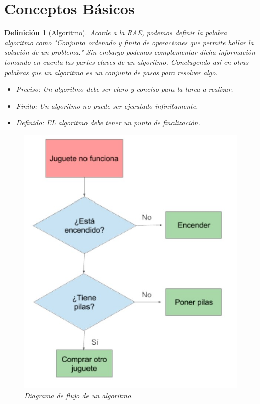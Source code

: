 \documentclass[12pt,twoside]{article}
\newtheorem{defi}{Definición}
\begin{document}
\section{Conceptos B\'asicos}
\begin{defi}[Algoritmo]
Acorde a la RAE, podemos definir la palabra algoritmo como "Conjunto ordenado y finito de operaciones que permite hallar la solución de un problema."
Sin embargo podemos complementar dicha informaci\'on tomando en cuenta las partes claves de un algoritmo.
Concluyendo así en otras palabras que un algoritmo es un conjunto de pasos para resolver algo.
\begin{itemize}
\item Preciso: Un algoritmo debe ser claro y conciso para la tarea a realizar.
\item Finito: Un algoritmo no puede ser ejecutado infinitamente.
\item Definido: EL algoritmo debe tener un punto de finalización.
\end{itemize} 

\begin{figure}[h!]
\centering
\includegraphics[scale=0.5]{algoritmo.jpg}
\caption{Diagrama de flujo de un algoritmo.}
\label{fig:universe}
\end{figure}
\end{defi}
\end{document}
